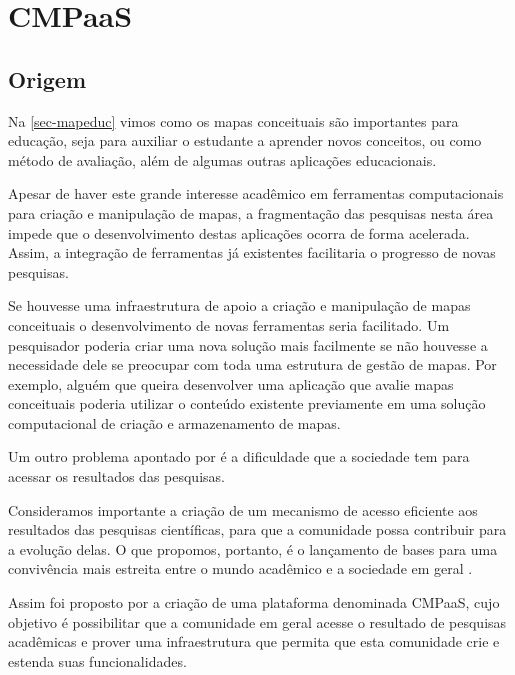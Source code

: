 \documentclass[
	12pt,				%
	openright,			%
	oneside,			%
	a4paper,			%
	english,			%
	french,				%
	spanish,			%
	brazil				%
	]{abntex2}
\begin{document}



\chapter{CMPaaS}
\section{Origem}

Na \autoref{sec-mapeduc} vimos como os mapas conceituais são importantes para educação, seja para auxiliar o estudante a aprender novos conceitos, ou como método de avaliação, além de algumas outras aplicações educacionais. 

Apesar de haver este grande interesse acadêmico em ferramentas computacionais para criação e manipulação de mapas, a fragmentação das pesquisas nesta área impede que o desenvolvimento destas aplicações ocorra de forma acelerada. Assim, a integração de ferramentas já existentes facilitaria o progresso de novas pesquisas.

Se houvesse uma infraestrutura de apoio a criação e manipulação de mapas conceituais o desenvolvimento de novas ferramentas seria facilitado. Um pesquisador poderia criar uma nova solução mais facilmente se não houvesse a necessidade dele se preocupar com toda uma estrutura de gestão de mapas. Por exemplo, alguém que queira desenvolver uma aplicação que avalie mapas conceituais poderia utilizar o conteúdo existente previamente em uma solução computacional de criação e armazenamento de mapas.

Um outro problema apontado por  é a dificuldade que a sociedade tem para acessar os resultados das pesquisas.
\begin{citacao}
	Consideramos importante a criação de um mecanismo de
	acesso eficiente aos resultados das pesquisas científicas, para que a comunidade possa contribuir para a evolução delas. O que propomos, portanto, é o lançamento de bases para uma convivência mais estreita entre o mundo acadêmico e a sociedade em geral \cite{Perin2014}.
\end{citacao}

Assim foi proposto por  a criação de uma plataforma denominada CMPaaS, cujo objetivo é possibilitar que a comunidade em geral acesse o resultado de pesquisas acadêmicas e prover uma infraestrutura que permita que esta comunidade crie e estenda suas funcionalidades.
\end{document}

